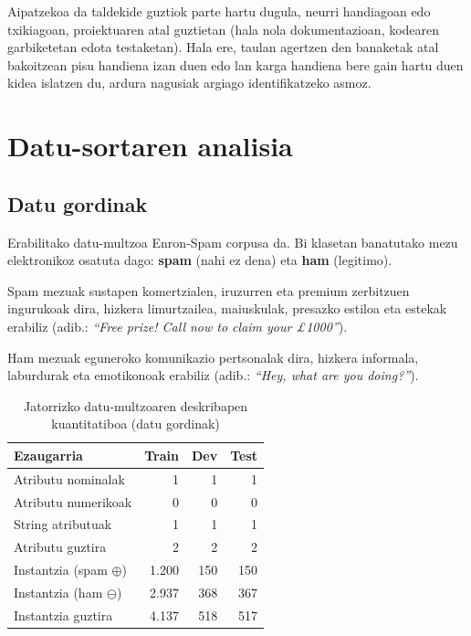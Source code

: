 \documentclass[12pt, a4paper]{article}
\begin{document}
Aipatzekoa da taldekide guztiok parte hartu dugula, neurri handiagoan edo txikiagoan, proiektuaren atal guztietan (hala nola dokumentazioan, kodearen garbiketetan edota testaketan). Hala ere, taulan agertzen den banaketak atal bakoitzean pisu handiena izan duen edo lan karga handiena bere gain hartu duen kidea islatzen du, ardura nagusiak argiago identifikatzeko asmoz.

\newpage
\section{Datu-sortaren analisia}

\subsection{Datu gordinak}

Erabilitako datu-multzoa Enron-Spam corpusa da. Bi klasetan banatutako mezu elektronikoz osatuta dago: \textbf{spam} (nahi ez dena) eta \textbf{ham} (legitimo).

Spam mezuak sustapen komertzialen, iruzurren eta premium zerbitzuen ingurukoak dira, hizkera limurtzailea, maiuskulak, presazko estiloa eta estekak erabiliz (adib.: \textit{``Free prize! Call now to claim your \pounds 1000''}).

Ham mezuak eguneroko komunikazio pertsonalak dira, hizkera informala,
laburdurak eta emotikonoak erabiliz (adib.: \textit{``Hey, what are you doing?''}).

\begin{table}[H]
    \centering
    \caption{Jatorrizko datu-multzoaren deskribapen kuantitatiboa (datu gordinak)}
    \begin{tabular}{lrrr}
        \toprule
        \textbf{Ezaugarria} & \textbf{Train} & \textbf{Dev} & \textbf{Test} \\
        \midrule
        Atributu nominalak  & 1     & 1     & 1     \\
        Atributu numerikoak & 0     & 0     & 0     \\
        String atributuak   & 1     & 1     & 1     \\
        Atributu guztira    & 2     & 2     & 2     \\
        \midrule
        Instantzia (spam $\oplus$)  & 1.200 & 150   & 150   \\
        Instantzia (ham $\ominus$)  & 2.937 & 368   & 367   \\
        Instantzia guztira          & 4.137 & 518   & 517   \\
        \bottomrule
    \end{tabular}
    \label{tab:datuak_gordinak}
\end{table}
\end{document}
